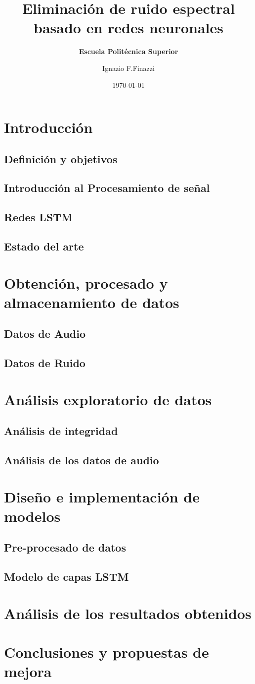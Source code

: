 \documentclass[10pt]{beamer}
\title[] %
{ %
      \textbf{Eliminación de ruido espectral basado en redes neuronales}
}
\subtitle[Escuela Politécnica Superior]
{
      \textbf{Escuela Politécnica Superior}
}
\author[Ignazio F.Finazzi]
{      Ignazio F.Finazzi \\
      {}
}
\institute[]
{
      Escuela Politécnica Superior\\
      Universidad Europea Miguel de Cervantes\\
  
}
\date{\today}
\begin{document}
	
	
	\scriptsize
	\section{Introducción}
		\subsection{Definición y objetivos}
			
		\subsection{Introducción al Procesamiento de señal}
			
		\subsection{Redes LSTM}
			
		\subsection{Estado del arte}
			
	\section{Obtención, procesado y almacenamiento de datos}
		\subsection{Datos de Audio}
		\subsection{Datos de Ruido}
	\section{Análisis exploratorio de datos}
		\subsection{Análisis de integridad}
		\subsection{Análisis de los datos de audio}
	\section{Diseño e implementación de modelos}
		\subsection{Pre-procesado de datos}
		\subsection{Modelo de capas LSTM}
	\section{Análisis de los resultados obtenidos}
	\section{Conclusiones y propuestas de mejora}
	
	
\end{document}
